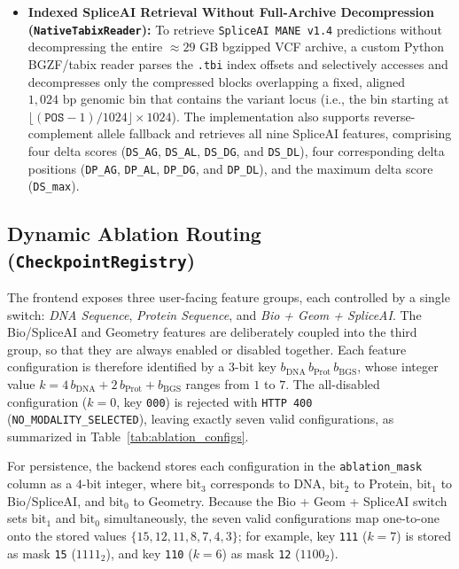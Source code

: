 \begin{itemize}
    \item \textbf{Indexed SpliceAI Retrieval Without Full-Archive Decompression (\texttt{NativeTabixReader}):} To retrieve \texttt{SpliceAI MANE v1.4} predictions without decompressing the entire $\approx 29\text{ GB}$ bgzipped VCF archive, a custom Python BGZF/tabix reader parses the \texttt{.tbi} index offsets and selectively accesses and decompresses only the compressed blocks overlapping a fixed, aligned $1{,}024\text{ bp}$ genomic bin that contains the variant locus (i.e., the bin starting at $\lfloor (\texttt{POS}-1)/1024 \rfloor \times 1024$). The implementation also supports reverse-complement allele fallback and retrieves all nine SpliceAI features, comprising four delta scores (\texttt{DS\_AG}, \texttt{DS\_AL}, \texttt{DS\_DG}, and \texttt{DS\_DL}), four corresponding delta positions (\texttt{DP\_AG}, \texttt{DP\_AL}, \texttt{DP\_DG}, and \texttt{DP\_DL}), and the maximum delta score (\texttt{DS\_max}).
\end{itemize}


\subsection{Dynamic Ablation Routing (\texttt{CheckpointRegistry})}
\label{subsec:ablation_routing}

The frontend exposes three user-facing feature groups, each controlled by a single switch: \textit{DNA Sequence}, \textit{Protein Sequence}, and \textit{Bio + Geom + SpliceAI}. The Bio/SpliceAI and Geometry features are deliberately coupled into the third group, so that they are always enabled or disabled together. Each feature configuration is therefore identified by a $3$-bit key $b_{\text{DNA}}\,b_{\text{Prot}}\,b_{\text{BGS}}$, whose integer value $k = 4\,b_{\text{DNA}} + 2\,b_{\text{Prot}} + b_{\text{BGS}}$ ranges from $1$ to $7$. The all-disabled configuration ($k = 0$, key \texttt{000}) is rejected with \texttt{HTTP 400} (\texttt{NO\_MODALITY\_SELECTED}), leaving exactly seven valid configurations, as summarized in Table~\ref{tab:ablation_configs}.

For persistence, the backend stores each configuration in the \texttt{ablation\_mask} column as a $4$-bit integer, where $\text{bit}_3$ corresponds to DNA, $\text{bit}_2$ to Protein, $\text{bit}_1$ to Bio/SpliceAI, and $\text{bit}_0$ to Geometry. Because the Bio + Geom + SpliceAI switch sets $\text{bit}_1$ and $\text{bit}_0$ simultaneously, the seven valid configurations map one-to-one onto the stored values $\{15, 12, 11, 8, 7, 4, 3\}$; for example, key \texttt{111} ($k = 7$) is stored as mask \texttt{15} ($1111_2$), and key \texttt{110} ($k = 6$) as mask \texttt{12} ($1100_2$).

